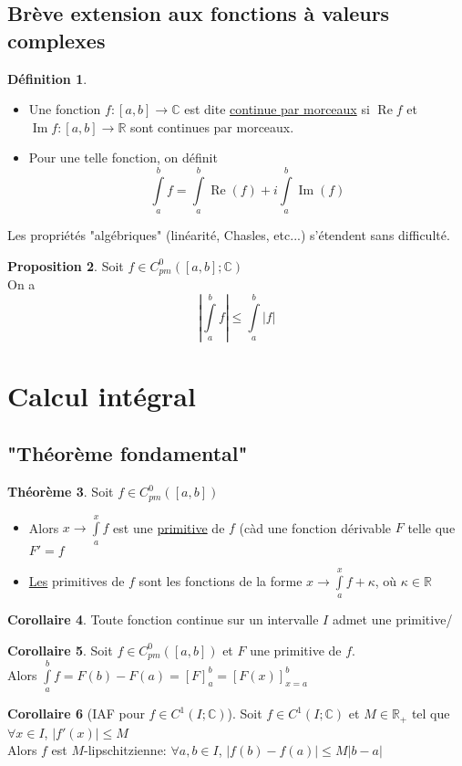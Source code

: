\documentclass[10pt,a4paper]{article}
\theoremstyle{definition}
\newtheorem{proposition}{Proposition}[section]
\newtheorem{theorem}[proposition]{Théorème}
\newtheorem{corollaire}[proposition]{Corollaire}
\newtheorem{definition}[proposition]{Définition}
\DeclareMathOperator{\re}{Re}
\DeclareMathOperator{\im}{Im}
\begin{document}
\subsection{Brève extension aux fonctions à valeurs complexes}
\begin{definition}
\hfill
\begin{itemize}
\item Une fonction $f: [a, b] \to \mathbb{C}$ est dite \uline{continue par morceaux} si $\re f$ et $\im f: [a, b] \to \mathbb{R}$ sont continues par morceaux.
\item Pour une telle fonction, on définit
\[\int\limits_{a}^{b} f = \int\limits_{a}^{b} \re(f) + i \int\limits_{a}^{b} \im(f)\]
\end{itemize}
\end{definition}
Les propriétés "algébriques" (linéarité, Chasles, etc...) s'étendent sans difficulté.
\begin{proposition}
Soit $f \in C_{pm}^{0}([a, b]; \mathbb{C})$ \\
On a
\[\left| \int\limits_{a}^{b} f \right| \leq \int\limits_{a}^{b} |f|\]
\end{proposition}

\section{Calcul intégral}
\subsection{"Théorème fondamental"}
\begin{theorem}
Soit $f \in C_{pm}^{0}([a, b])$
\begin{itemize}
\item Alors $x \to \int\limits_{a}^{x} f$ est une \uline{primitive} de $f$ (càd une fonction dérivable $F$ telle que $F' = f$
\item \uline{Les} primitives de $f$ sont les fonctions de la forme $x \to \int\limits_{a}^{x} f + \kappa$, où $\kappa \in \mathbb{R}$
\end{itemize}
\end{theorem}
\begin{corollaire}
Toute fonction continue sur un intervalle $I$ admet une primitive/
\end{corollaire}
\begin{corollaire}
Soit $f \in C_{pm}^{0}([a, b])$ et $F$ une primitive de $f$. \\
Alors $\int\limits_{a}^{b} f = F(b) - F(a) = \left[ F \right]_a^b = \left[F(x)\right]_{x = a}^b$
\end{corollaire}
\begin{corollaire}[IAF pour $f \in C^1(I; \mathbb{C})$]
Soit $f \in C^1(I; \mathbb{C})$ et $M \in \mathbb{R}_+$ tel que $\forall x \in I$, $|f'(x)| \leq M$ \\
Alors $f$ est $M$-lipschitzienne: $\forall a, b \in I$, $|f(b) - f(a)| \leq M |b - a|$
\end{corollaire}
\end{document}
